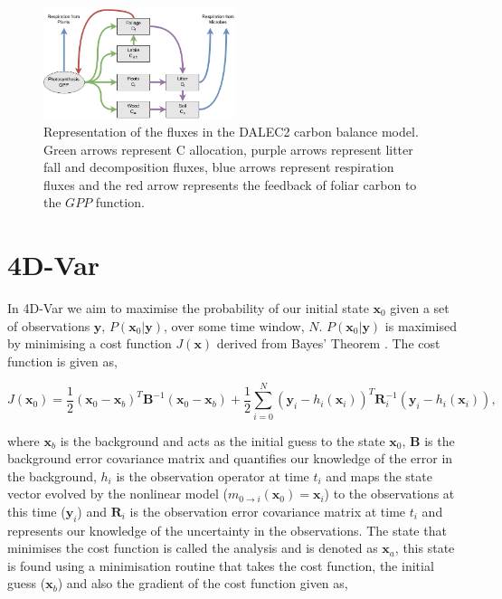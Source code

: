 \documentclass[11pt]{article}
\begin{document}
\begin{figure}[ht]
    \centering
    \includegraphics[width=0.5\textwidth]{Dalecdiagram.png}
    \caption{Representation of the fluxes in the DALEC2 carbon balance model. Green arrows represent C allocation, purple arrows represent litter fall and decomposition fluxes, blue arrows represent respiration fluxes and the red arrow represents the feedback of foliar carbon to the $GPP$ function.}
    \label{fig:DALEC_mod}
\end{figure}

\section{4D-Var} \label{4dvar}

In 4D-Var we aim to maximise the probability of our initial state $\textbf{x}_0$ given a set of observations $\textbf{y}$, $P(\textbf{x}_0|\textbf{y})$, over some time window, $N$. $P(\textbf{x}_0|\textbf{y})$ is maximised by minimising a cost function $J(\textbf{x})$ derived from Bayes' Theorem \citep{lewis2006dynamic}. The cost function is given as,

\begin{equation}
J(\textbf{x}_0) = \frac{1}{2}(\textbf{x}_0-\textbf{x}_b)^{T}\textbf{B}^{-1}(\textbf{x}_0-\textbf{x}_b)+\frac{1}{2}\sum_{i=0}^{N}(\textbf{y}_i-h_i(\textbf{x}_i))^{T}\textbf{R}_{i}^{-1}(\textbf{y}_i-h_i(\textbf{x}_i)),
\end{equation}

where $\textbf{x}_b$ is the background and acts as the initial guess to the state $\textbf{x}_0$, $\textbf{B}$ is the background error covariance matrix and quantifies our knowledge of the error in the background, $h_i$ is the observation operator at time $t_i$ and maps the state vector evolved by the nonlinear model ($m_{0\rightarrow i}(\mathbf{x}_{0})=\textbf{x}_i$) to the observations at this time ($\textbf{y}_i$) and $\textbf{R}_i$ is the observation error covariance matrix at time $t_i$ and represents our knowledge of the uncertainty in the observations. The state that minimises the cost function is called the analysis and is denoted as $\textbf{x}_a$, this state is found using a minimisation routine that takes the cost function, the initial guess ($\textbf{x}_b$) and also the gradient of the cost function given as,
\end{document}

